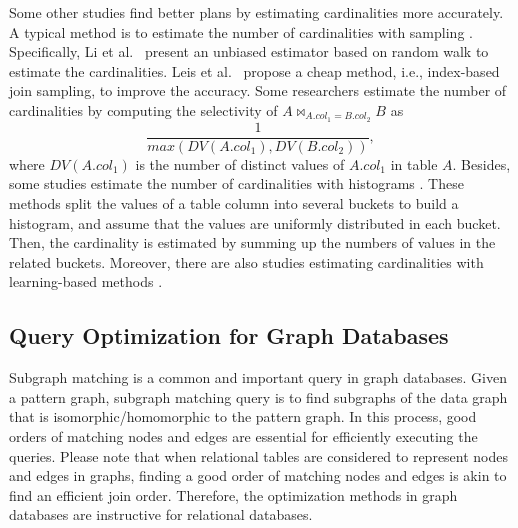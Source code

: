 Some other studies find better plans by estimating cardinalities more accurately.
A typical method is to estimate the number of cardinalities with sampling \cite{index-based-join-sampling,ripple-join,wanderjoin,index-based-join-sampling}.
Specifically, Li et al.~\cite{wanderjoin} present an unbiased estimator based on random walk to estimate the cardinalities.
Leis et al.~\cite{index-based-join-sampling} propose a cheap method, i.e., index-based join sampling, to improve the accuracy.
Some researchers \cite{selinger,postgres-row-estimation} estimate the number of cardinalities by computing the selectivity of $A \bowtie_{A.col_1 = B.col_2} B$ as 
\begin{equation*}
    \frac{1}{max(DV(A.col_1), DV(B.col_2))},
\end{equation*}
where $DV(A.col_1)$ is the number of distinct values of $A.col_1$ in table $A$.
Besides, some studies estimate the number of cardinalities with histograms \cite{histogram,postgres-row-estimation}.
These methods split the values of a table column into several buckets to build a histogram, and assume that the values are uniformly distributed in each bucket.
Then, the cardinality is estimated by summing up the numbers of values in the related buckets.
Moreover, there are also studies estimating cardinalities with learning-based methods \cite{learning-based-estimation-1,learning-based-estimation-2,learning-based-estimation-3,learning-based-estimation-4}.


\subsection{Query Optimization for Graph Databases}
\label{sec:related-work:gopt}
Subgraph matching is a common and important query in graph databases.
Given a pattern graph, subgraph matching query is to find subgraphs of the data graph that is isomorphic/homomorphic to the pattern graph.
In this process, good orders of matching nodes and edges are essential for efficiently executing the queries.
Please note that when relational tables are considered to represent nodes and edges in graphs, finding a good order of matching nodes and edges is akin to find an efficient join order.
Therefore, the optimization methods in graph databases are instructive for relational databases.

